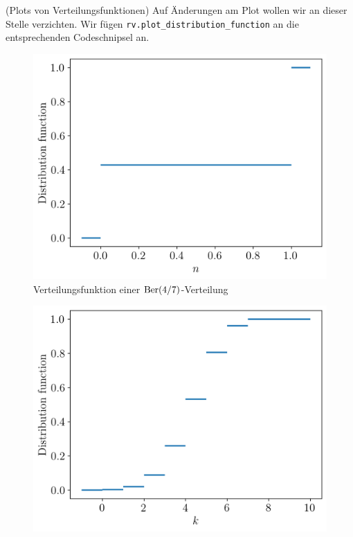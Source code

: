 \begin{Beispiel}{(Plots von Verteilungsfunktionen)}
Auf Änderungen am Plot wollen wir an dieser Stelle verzichten. Wir fügen \lstinline|rv.plot_distribution_function| an die entsprechenden Codeschnipsel an.\\
\begin{minipage}{0.5\linewidth}
\begin{figure}[H]
\begin{center}
\includegraphics[width=.9\linewidth]{./Section/Grundlegende Begriffe/Verteilungsfunktion Bernoulli.png}
\vspace*{-.3\baselineskip}
\caption{\centering Verteilungsfunktion einer $\operatorname{Ber}(4/7)$-Verteilung}
\vspace*{-.3\baselineskip}
\end{center}
\end{figure}
\end{minipage}
\begin{minipage}{0.5\linewidth}
\begin{figure}[H]
\begin{center}
\includegraphics[width=.9\linewidth]{./Section/Grundlegende Begriffe/Verteilungsfunktion Binomial.png}

\end{center}
\end{figure}
\end{minipage}
\end{Beispiel}
